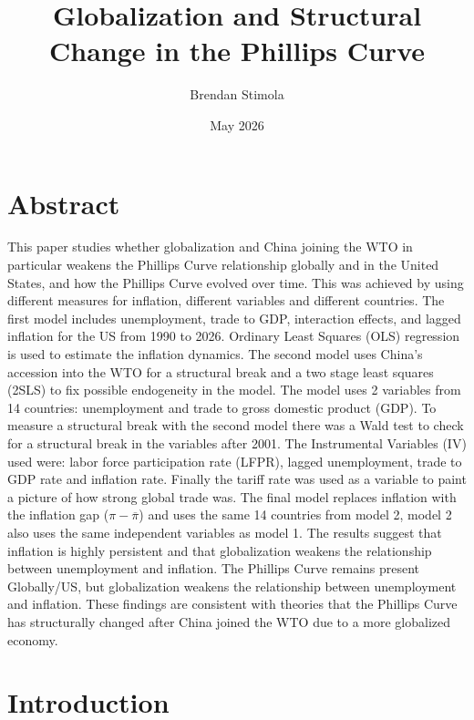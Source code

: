 \documentclass{article}
\title{Globalization and Structural Change in the Phillips Curve}
\author{Brendan Stimola}
\date{May 2026}
\begin{document}

\maketitle

\section{Abstract}

This paper studies whether globalization and China joining the WTO in particular weakens the Phillips Curve relationship globally and in the United States, and how the Phillips Curve evolved over time. This was achieved by using different measures for inflation, different variables and different countries. The first model includes unemployment, trade to GDP, interaction effects, and lagged inflation for the US from 1990 to 2026. Ordinary Least Squares (OLS) regression is used to estimate the inflation dynamics. The second model uses China's accession into the WTO for a structural break and a two stage least squares (2SLS) to fix possible endogeneity in the model. The model uses 2 variables from 14 countries: unemployment and trade to gross domestic product (GDP). To measure a structural break with the second model there was a Wald test to check for a structural break in the variables after 2001. The Instrumental Variables (IV) used were: labor force participation rate (LFPR), lagged unemployment, trade to GDP rate and inflation rate. Finally the tariff rate was used as a variable to paint a picture of how strong global trade was. The final model replaces inflation with the inflation gap ($\pi-\overline{\pi}$) and uses the same 14 countries from model 2, model 2 also uses the same independent variables as model 1. The results suggest that inflation is highly persistent and that globalization weakens the relationship between unemployment and inflation. The Phillips Curve remains present Globally/US, but globalization weakens the relationship between unemployment and inflation. These findings are consistent with theories that the Phillips Curve has structurally changed after China joined the WTO due to a more globalized economy. 

\section{Introduction}
\end{document}
